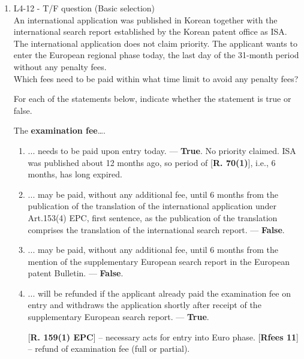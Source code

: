 \documentclass{report}
\begin{document}
\begin{enumerate}[label=\textbf{Answer \arabic*}]
\begin{enumerate}[label=\textbf{Answer \arabic*}]
\begin{enumerate}[label=(\alph*)]
\begin{enumerate}[label=(\roman*)]
        \end{enumerate}

    \end{enumerate}

    \item %
    L4-12 - T/F question (Basic selection) \\
    An international application was published in Korean together with the international search report established by the Korean patent office as ISA. The international application does not claim priority. The applicant wants to enter the European regional phase today, the last day of the 31-month period without any penalty fees. \\
    Which fees need to be paid within what time limit to avoid any penalty fees?

    \vspace{1em}
    For each of the statements below, indicate whether the statement is true or false.
    
    \vspace{0.5em}
    The \textbf{examination fee}….
    \begin{enumerate}[label=(\alph*)]
        \item ... needs to be paid upon entry today. --- \textbf{True}. No priority claimed. ISA was published about 12 months ago, so period of [\textbf{R. 70(1)}], i.e., 6 months, has long expired.
        \item ... may be paid, without any additional fee, until 6 months from the publication of the translation of the international application under Art.153(4) EPC, first sentence, as the publication of the translation comprises the translation of the international search report. --- \textbf{False}.
        \item ... may be paid, without any additional fee, until 6 months from the mention of the supplementary European search report in the European patent Bulletin. --- \textbf{False}.
        \item ... will be refunded if the applicant already paid the examination fee on entry and withdraws the application shortly after receipt of the supplementary European search report. --- \textbf{True}. \newline
        
        [\textbf{R. 159(1) EPC}] -- necessary acts for entry into Euro phase. \newline
        [\textbf{Rfees 11}] -- refund of examination fee (full or partial).
    \end{enumerate}


\end{enumerate}
\end{enumerate}
\end{document}
